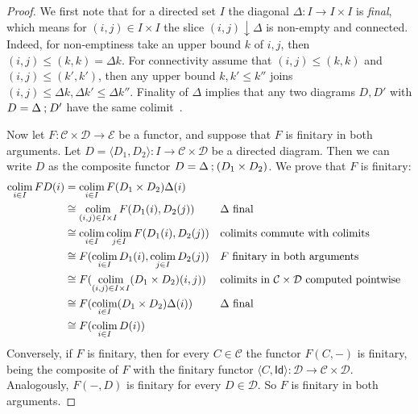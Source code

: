 \documentclass[a4paper, UKenglish, numberwithinsect, thm-restate, cleveref, final]{lipics-v2021}
\theoremstyle{plain}
\theoremstyle{definition}
\newcommand{\C}{\ensuremath{\mathcal{C}}}
\newcommand{\Id}{\ensuremath{\mathsf{Id}}}
\newcommand{\seq}{\ensuremath{\mathbin{\text{\upshape;}}}}
\newcommand{\D}{\ensuremath{\mathcal{D}}}
\def\colim{\qopname\relax m{colim}}
\newcommand{\cat}[1]{\ensuremath{\mathcal{#1}}\xspace}
\def\colim{\qopname\relax m{colim}}
\numberwithin{equation}{section}
\begin{document}
\begin{proof}
We first note that for a directed set \(I\) the diagonal \(\Delta \colon I \rightarrow I \times I\) is \emph{final}, which means
for \((i, j) \in I \times I\) the slice \((i, j) \downarrow \Delta\) is non-empty and connected.
Indeed, for non-emptiness take an upper bound \(k\) of \(i, j\), then \((i, j) \le (k, k) = \Delta k\).
For connectivity assume that \((i, j) \le (k, k)\) and \((i, j) \le (k', k')\), then any upper bound \(k, k' \le k''\) joins \((i, j) \le \Delta k, \Delta k' \le \Delta k''\). Finality of $\Delta$ implies that any two diagrams $D,D'$ with $D= \Delta \seq D'$ have the same colimit~\cite[Section IX.3]{maclane}.




Now let \(F \colon \cat C \times \cat D \rightarrow \cat E\) be a functor, and suppose that
 \(F\) is finitary in both arguments. Let \(D = \langle D_{1}, D_{2} \rangle \colon I \rightarrow \cat C \times \cat D\) be a directed diagram. Then we can write \(D\) as the composite functor \(D = \Delta \seq (D_{1} \times D_{2})\). We prove that $F$ is finitary:
\begin{align*}
  \colim_{i \in I} F D(i) &= \colim_{i \in I} F (D_{1} \times D_{2}) \Delta (i) \\
                          &\cong \colim_{(i, j) \in I \times I} F (D_{1}(i), D_{2}(j))  && \text{\(\Delta\) final} \\
                          &\cong \colim_{i \in I} \colim_{j \in I} F(D_{1}(i),D_{2}(j)) && \text{colimits commute with colimits} \\
                          &\cong  F(\colim_{i \in I}D_{1}(i),\colim_{j \in I}D_{2}(j)) && \text{\(F\) finitary in both arguments}\\
                          &\cong  F(\colim_{(i,j) \in I \times I} (D_{1} \times D_{2})(i, j)) && \text{colimits in \(\cat C \times \cat D\) computed pointwise} \\
                          &\cong F(\colim_{i \in I}(D_{1} \times D_{2})\Delta(i)) && \text{\(\Delta\) final}\\
                          &\cong F(\colim_{i \in I}D(i))
\end{align*}
Conversely, if \(F\) is finitary, then for every $C\in \C$ the functor \(F(C, -)\) is finitary, being the composite of $F$ with the finitary functor $\langle C,\Id\rangle\colon \D\to \C\times \D$. Analogously, $F(-,D)$ is finitary for every $D\in \D$. So $F$ is finitary in both arguments.
\end{proof}
\end{document}
